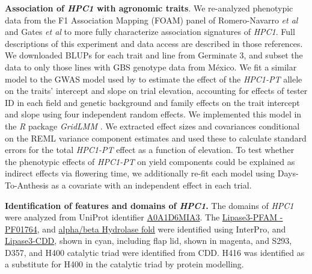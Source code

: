 \documentclass[9pt,twocolumn,twoside,lineno]{BioRxiv}
\begin{document}
\textbf{Association of \textit{HPC1} with agronomic traits}.
We re-analyzed phenotypic data from the F1 Association Mapping (FOAM) panel of Romero-Navarro \textit{et al} \cite{Romero_Navarro2017-cn} and Gates \textit{et al} \cite{Gates2019-xu} to more fully characterize association signatures of \textit{HPC1}. 
Full descriptions of this experiment and data access are described in those references. 
We downloaded BLUPs for each trait and line from Germinate 3, and subset the data to only those lines with GBS genotype data from México. 
We fit a similar model to the GWAS model used by \cite{Gates2019-xu} to estimate the effect of the \textit{HPC1-PT} allele on the traits' intercept and slope on trial elevation, accounting for effects of tester ID in each field and genetic background and family effects on the trait intercept and slope using four independent random effects. 
We implemented this model in the \textit{R} package \textit{GridLMM} \cite{Runcie2019-Gr}. 
We extracted effect sizes and covariances conditional on the REML variance component estimates and used these to calculate standard errors for the total \textit{HPC1-PT} effect as a function of elevation. 
To test whether the phenotypic effects of \textit{HPC1-PT} on yield components could be explained as indirect effects via flowering time, we additionally re-fit each model using Days-To-Anthesis as a covariate with an independent effect in each trial.

\textbf{Identification of features and domains of \textit{HPC1}.}
The domains of \textit{HPC1} were analyzed from UniProt identifier \hyperlink{https://www.uniprot.org/uniprot/A0A1D6MIA3}{A0A1D6MIA3}. 
The \hyperlink{https://www.ebi.ac.uk/interpro/entry/pfam/PF01764/}{Lipase3-PFAM - PF01764}, and \hyperlink{https://www.ebi.ac.uk/interpro/entry/InterPro/IPR029058/}{alpha/beta Hydrolase fold} were identified using InterPro, and \hyperlink{https://www.ncbi.nlm.nih.gov/Structure/cdd/cddsrv.cgi?uid=cd00519}{Lipase3-CDD}, shown in cyan, including flap lid, shown in magenta, and S293, D357, and H400 catalytic triad were identified from CDD. 
H416 was identified as a substitute for H400 in the catalytic triad by protein modelling.
\end{document}
